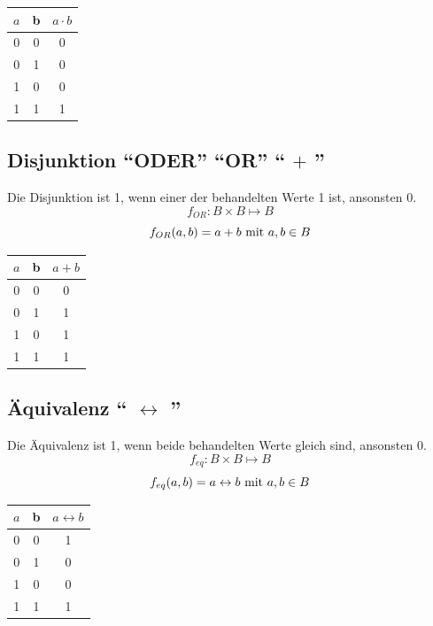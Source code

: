 \documentclass[11pt,a4paper]{scrreprt}
\begin{document}
\begin{center}
\begin{tabular}{ccc}
	$a$ & b & $a \cdot b$ \\ \hline
	 0  & 0 &    0    \\
	 0  & 1 &    0    \\
	 1  & 0 &    0    \\
	 1  & 1 &    1    \\
\end{tabular}
\end{center}

\subsection{Disjunktion "`ODER"' "`OR"' "` $+$ "'}
Die Disjunktion ist 1, wenn einer der behandelten Werte 1 ist, ansonsten 0.
$$ f_{OR}: B \times B \mapsto B $$
$$ f_{OR}(a, b) = a + b \textnormal{ mit } a, b \in B$$

\begin{center}
\begin{tabular}{ccc}
	$a$ & b & $a + b$ \\ \hline
	 0  & 0 &    0    \\
	 0  & 1 &    1    \\
	 1  & 0 &    1    \\
	 1  & 1 &    1    \\
\end{tabular}
\end{center}

\subsection{Äquivalenz "` $\leftrightarrow$ "'}
Die Äquivalenz ist 1, wenn beide behandelten Werte gleich sind, ansonsten 0.
$$ f_{eq}: B \times B \mapsto B $$
$$ f_{eq}(a, b) = a \leftrightarrow b \textnormal{ mit } a, b \in B$$

\begin{center}
\begin{tabular}{ccc}
	$a$ & b & $a \leftrightarrow b$ \\ \hline
	 0  & 0 &    1    \\
	 0  & 1 &    0    \\
	 1  & 0 &    0    \\
	 1  & 1 &    1    \\
\end{tabular}
\end{center}
\end{document}
